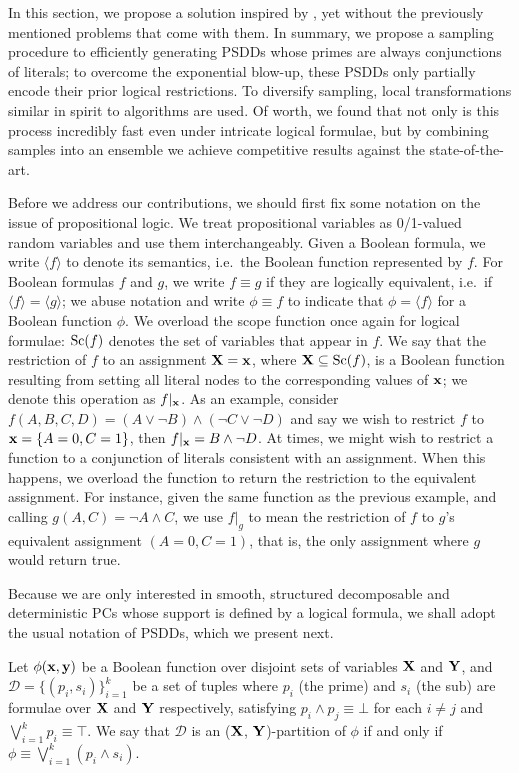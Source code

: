 In this section, we propose a solution inspired by \citet{geh20,mattei19}, yet without the
previously mentioned problems that come with them. In summary, we propose a sampling procedure to
efficiently generating PSDDs whose primes are always conjunctions of literals; to overcome the
exponential blow-up, these PSDDs only partially encode their prior logical restrictions. To
diversify sampling, local transformations similar in spirit to \incrclass{} algorithms are used.
Of worth, we found that not only is this process incredibly fast even under intricate logical
formulae, but by combining samples into an ensemble we achieve competitive results against the
state-of-the-art.

Before we address our contributions, we should first fix some notation on the issue of
propositional logic. We treat propositional variables as 0/1-valued random variables and use them
interchangeably. Given a Boolean formula, we write $\langle f\rangle$ to denote its semantics,
i.e.\ the Boolean function represented by $f$. For Boolean formulas $f$ and $g$, we write $f\equiv
g$ if they are logically equivalent, i.e.\ if $\langle f\rangle=\langle g\rangle$; we abuse
notation and write $\phi\equiv f$ to indicate that $\phi=\langle f\rangle$ for a Boolean function
$\phi$. We overload the scope function once again for logical formulae: $\operatorname*{\normalfont{Sc}}(f)$ denotes the set of
variables that appear in $f$. We say that the restriction of $f$ to an assignment
$\mathbf{X}=\mathbf{x}$, where $\mathbf{X}\subseteq\operatorname*{\normalfont{Sc}}(f)$, is a Boolean function resulting from setting all
literal nodes to the corresponding values of $\mathbf{x}$; we denote this operation as $f|_{\mathbf{x}}$.
As an example, consider $f(A,B,C,D)=(A\vee\neg B)\wedge(\neg C\vee\neg D)$ and say we wish to
restrict $f$ to $\mathbf{x}=\{A=0,C=1\}$, then $f|_{\mathbf{x}}=B\wedge\neg D$. At times, we might wish to
restrict a function to a conjunction of literals consistent with an assignment. When this happens,
we overload the function to return the restriction to the equivalent assignment. For instance,
given the same function as the previous example, and calling $g(A,C)=\neg A\wedge C$, we use $f|_g$
to mean the restriction of $f$ to $g$'s equivalent assignment $(A=0,C=1)$, that is, the only
assignment where $g$ would return true.

Because we are only interested in smooth, structured decomposable and deterministic PCs whose
support is defined by a logical formula, we shall adopt the usual notation of PSDDs, which we
present next.

\begin{definition}[Partition]\label{def:partition}
  Let $\phi(\mathbf{x},\mathbf{y})$ be a Boolean function over disjoint sets of variables $\mathbf{X}$ and
  $\mathbf{Y}$, and $\mathcal{D}=\{(p_i,s_i)\}_{i=1}^k$ be a set of tuples where $p_i$ (the prime) and
  $s_i$ (the sub) are formulae over $\mathbf{X}$ and $\mathbf{Y}$ respectively, satisfying $p_i\wedge
  p_j\equiv\bot$ for each $i\neq j$ and $\bigvee_{i=1}^k p_i\equiv\top$. We say that $\mathcal{D}$
  is an ($\mathbf{X}$, $\mathbf{Y}$)-partition of $\phi$ if and only if
  $\phi\equiv\bigvee_{i=1}^k(p_i\wedge s_i)$.
\end{definition}

